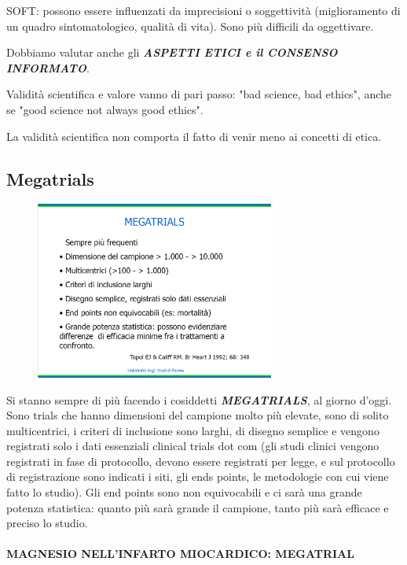 SOFT: possono essere influenzati da imprecisioni o soggettività
(miglioramento di un quadro sintomatologico, qualità di vita). Sono più
difficili da oggettivare.

Dobbiamo valutar anche gli \textbf{\emph{ASPETTI ETICI e il CONSENSO
INFORMATO}}.

Validità scientifica e valore vanno di pari passo: "bad science, bad
ethics", anche se "good science not always good ethics".

La validità scientifica non comporta il fatto di venir meno ai concetti
di etica.

\subsection{Megatrials}

\begin{figure}[!ht]
\centering
\includegraphics[width=0.7\textwidth]{05/image15.png}
\end{figure}

Si stanno sempre di più facendo i cosiddetti \textbf{\emph{MEGATRIALS}},
al giorno d'oggi. Sono trials che hanno dimensioni del campione molto
più elevate, sono di solito multicentrici, i criteri di inclusione sono
larghi, di disegno semplice e vengono registrati solo i dati essenziali
clinical trials dot com (gli studi clinici vengono registrati in fase di
protocollo, devono essere registrati per legge, e sul protocollo di
registrazione sono indicati i siti, gli ends points, le metodologie con
cui viene fatto lo studio). Gli end points sono non equivocabili e ci
sarà una grande potenza statistica: quanto più sarà grande il campione,
tanto più sarà efficace e preciso lo studio.

\paragraph{MAGNESIO NELL'INFARTO MIOCARDICO: MEGATRIAL}

